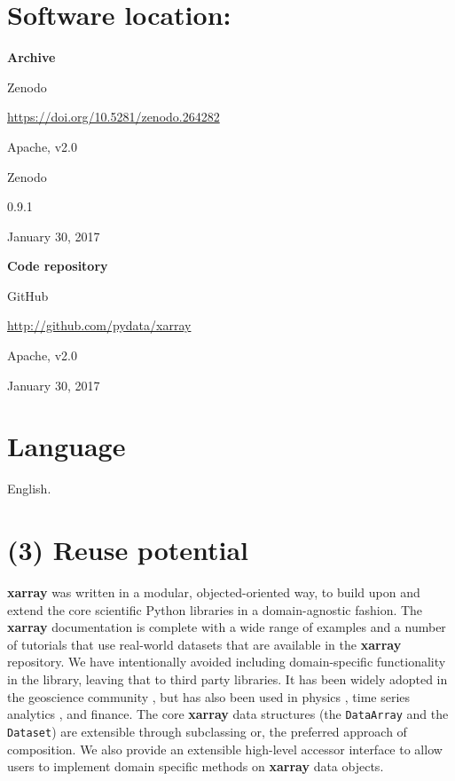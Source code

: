 \documentclass{jors}
\begin{document}
\section*{Software location:}

{\bf Archive}

\begin{description}[noitemsep,topsep=0pt]
	\item[Name:] Zenodo
	\item[Persistent identifier:] \url{https://doi.org/10.5281/zenodo.264282}
	\item[License:] Apache, v2.0
	\item[Publisher:]  Zenodo
	\item[Version published:] 0.9.1
	\item[Date published:] January 30, 2017
\end{description}

{\bf Code repository}

\begin{description}[noitemsep,topsep=0pt]
	\item[Name:] GitHub
	\item[Identifier:] \url{http://github.com/pydata/xarray}
	\item[License:] Apache, v2.0
	\item[Date published:] January 30, 2017
\end{description}

\section*{Language}

English.

\section*{(3) Reuse potential}

\textbf{xarray} was written in a modular, objected-oriented way, to build upon and extend the core scientific Python libraries in a domain-agnostic fashion.
The \textbf{xarray} documentation is complete with a wide range of examples and a number of tutorials that use real-world datasets that are available in the \textbf{xarray} repository.
We have intentionally avoided including domain-specific functionality in the library, leaving that to third party libraries.
It has been widely adopted in the geoscience community \citep[e.g.][]{xgcm,Dawson_2016a,Dawson_2016b}, but has also been used in physics \citep[e.g.][]{pycalphad}, time series analytics \citep{cesium}, and finance.
The core \textbf{xarray} data structures (the \verb|DataArray| and the \verb|Dataset|) are extensible through subclassing or, the preferred approach of composition.
We also provide an extensible high-level accessor interface to allow users to implement domain specific methods on \textbf{xarray} data objects.
\end{document}
